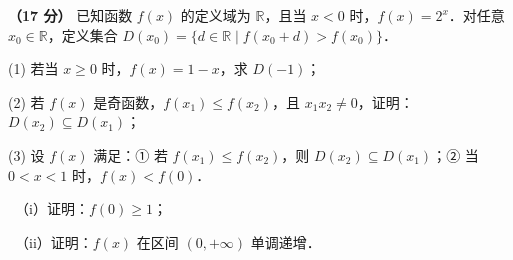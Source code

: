 \begin{question}
\textbf{（17 分）} 已知函数 $f(x)$ 的定义域为 $\mathbb{R}$，且当 $x<0$ 时，$f(x)=2^{x}$．对任意 $x_0\in\mathbb{R}$，定义集合 $D(x_0)=\{d\in\mathbb{R}\mid f(x_0+d)>f(x_0)\}$．

  (1) 若当 $x\ge 0$ 时，$f(x)=1-x$，求 $D(-1)$；

  (2) 若 $f(x)$ 是奇函数，$f(x_1)\le f(x_2)$，且 $x_1x_2\ne 0$，证明：$D(x_2)\subseteq D(x_1)$；

  (3) 设 $f(x)$ 满足：① 若 $f(x_1)\le f(x_2)$，则 $D(x_2)\subseteq D(x_1)$；② 当 $0<x<1$ 时，$f(x)<f(0)$．

  　（i）证明：$f(0)\ge 1$；

  　（ii）证明：$f(x)$ 在区间 $(0,+\infty)$ 单调递增．

\par\medskip


\end{question}